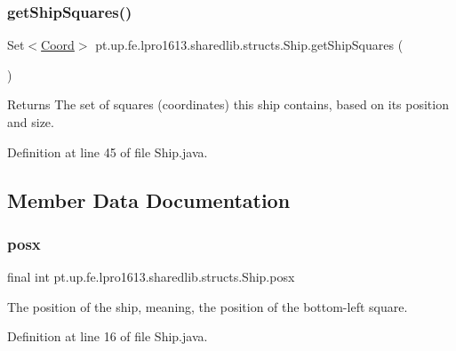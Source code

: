 \subsubsection{\texorpdfstring{get\+Ship\+Squares()}{getShipSquares()}}
{\footnotesize\ttfamily Set$<$\hyperlink{classpt_1_1up_1_1fe_1_1lpro1613_1_1sharedlib_1_1utils_1_1_coord}{Coord}$>$ pt.\+up.\+fe.\+lpro1613.\+sharedlib.\+structs.\+Ship.\+get\+Ship\+Squares (\begin{DoxyParamCaption}{ }\end{DoxyParamCaption})}

\begin{DoxyReturn}{Returns}
The set of squares (coordinates) this ship contains, based on its position and size. 
\end{DoxyReturn}


Definition at line 45 of file Ship.\+java.



\subsection{Member Data Documentation}
\hypertarget{classpt_1_1up_1_1fe_1_1lpro1613_1_1sharedlib_1_1structs_1_1_ship_ad26cd2dc8514c1238146781039fc0865}{}\label{classpt_1_1up_1_1fe_1_1lpro1613_1_1sharedlib_1_1structs_1_1_ship_ad26cd2dc8514c1238146781039fc0865} 
\subsubsection{\texorpdfstring{posx}{posx}}
{\footnotesize\ttfamily final int pt.\+up.\+fe.\+lpro1613.\+sharedlib.\+structs.\+Ship.\+posx}

The position of the ship, meaning, the position of the bottom-\/left square. 

Definition at line 16 of file Ship.\+java.

\hypertarget{classpt_1_1up_1_1fe_1_1lpro1613_1_1sharedlib_1_1structs_1_1_ship_ae895709b67554ee4cc154cb846f370c6}{}\label{classpt_1_1up_1_1fe_1_1lpro1613_1_1sharedlib_1_1structs_1_1_ship_ae895709b67554ee4cc154cb846f370c6} 
